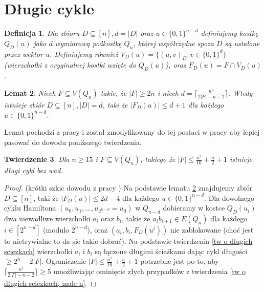 \documentclass{pracamgr}
\newtheorem{theorem}{Twierdzenie}[chapter]
\newtheorem{defi}[theorem]{Definicja}
\newtheorem{lemma}[theorem]{Lemat}
\begin{document}
  \section{Długie cykle}
   \begin{defi}\label{przekrój kostki}
    Dla zbioru $D\subseteq[n], d=|D|$ oraz $u\in\{0,1\}^{n-d}$ definiujemy kostkę $Q_D(u)$ jako $d$ wymiarową podkostkę $Q_n$, której współrzędne spoza $D$
    są ustalone przez wektor $u$. Definiujemy również $V_D(u)=\{(u,v)_D:v\in\{0,1\}^d\}$ (wierzchołki z oryginalnej kostki wzięte do $Q_D(u)$), oraz
    $F_D(u)=F\cap V_D(u)$.
   \end{defi}
   \begin{lemma}\label{dlugi cykl - podzial kostki}
    Niech $F\subseteq V(Q_n)$ takie, że $|F|\ge 2n$ i niech $d=\lceil\frac{n^2}{2|F|-n-2}\rceil$.
    Wtedy istnieje zbiór $D\subseteq[n],|D|=d$, taki że $|F_D(u)|\le d+1$ dla każdego $u\in\{0,1\}^{n-d}$.
   \end{lemma}
   Lemat pochodzi z pracy \cite{Wie} i został zmodyfikowany do tej postaci w pracy \cite{FG} aby lepiej pasować do dowodu poniższego twierdzenia.
   \begin{theorem}\label{dlugi cykl - tw}
    Dla $n\ge15$ i $F\subseteq V(Q_n)$, takiego że $|F|\le\frac{n^2}{10}+\frac{n}{2}+1$ istnieje długi cykl bez wad.
   \end{theorem}
   \begin{proof}
    (krótki szkic dowodu z pracy \cite{FG})\newline
    Na podstawie lematu \ref{dlugi cykl - podzial kostki} znajdujemy zbiór $D\subseteq[n]$, taki że $|F_D(u)|\le 2d-4$ dla każdego $u\in\{0,1\}^{n-d}$.
    Dla dowolnego cyklu Hamiltona $(u_0,u_1,...,u_{2^{n-d}}=u_0)$ w $Q_{n-d}$ dobieramy w kostce $Q_D(u_i)$ dwa niewadliwe
    wierzchołki $a_i$ oraz $b_i$, takie że $a_ib_{i+1}\in E(Q_n)$ dla każdego $i\in[2^{n-d}]$ (modulo $2^{n-d}$),
    oraz $(a_i,b_i,F_D(u^i))$ nie zablokowane (choć jest to nietrywialne to da sie takie dobrać).
    Na podstawie twierdzenia \ref{tw o dlugich sciezkach} wierzchołki $a_i$ i $b_i$ są łączone długimi ścieżkami dając cykl długości $\ge 2^n-2|F|$.
    Ograniczenie $|F|\le\frac{n^2}{10}+\frac{n}{2}+1$ potrzebne jest po to, aby $\lceil\frac{n^2}{2|F|-n-2}\rceil\ge5$ umożliwiając ominięcie złych
    przypadków z twierdzenia \ref{tw o dlugich sciezkach, male n}.
   \end{proof}
\end{document}
